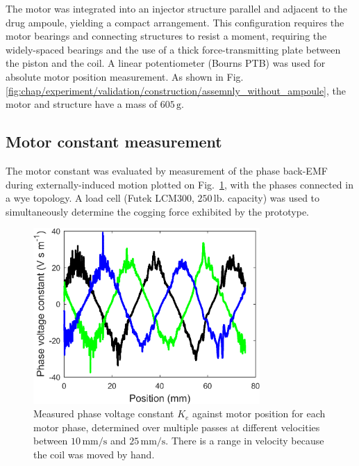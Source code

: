     
            The motor was integrated into an injector structure parallel and adjacent to the drug ampoule, yielding a compact arrangement. This configuration requires the motor bearings and connecting structures to resist a moment, requiring the widely-spaced bearings and the use of a thick force-transmitting plate between the piston and the coil. A linear potentiometer (Bourns PTB) was used for absolute motor position measurement. As shown in Fig.\,\ref{fig:chap/experiment/validation/construction/assemnly_without_ampoule}, the motor and structure have a mass of $605\,\mathrm{g}$.
    

        \subsection{Motor constant measurement}     \label{Chapter:experiment/validation/motor constant}
        
            
            The motor constant was evaluated by measurement of the phase back-EMF during externally-induced motion plotted on Fig.~\ref{fig:chap/experiment/motor_constant/kms_plot}, with the phases connected in a wye topology. A load cell (Futek LCM300, $250\,\mathrm{lb.}$ capacity) was used to simultaneously determine the cogging force exhibited by the prototype. 

        
            \begin{figure}[h]
                \centering
                \includegraphics[width=3.4in]{chap5/images/kms_plot.png}
                \caption{Measured phase voltage constant $K_e$ against motor position for each motor phase, determined over multiple passes at different velocities between $10\,\mathrm{mm/s}$ and $25\,\mathrm{mm/s}$. There is a range in velocity because the coil was moved by hand.}
                \label{fig:chap/experiment/motor_constant/kms_plot}
            \end{figure}


